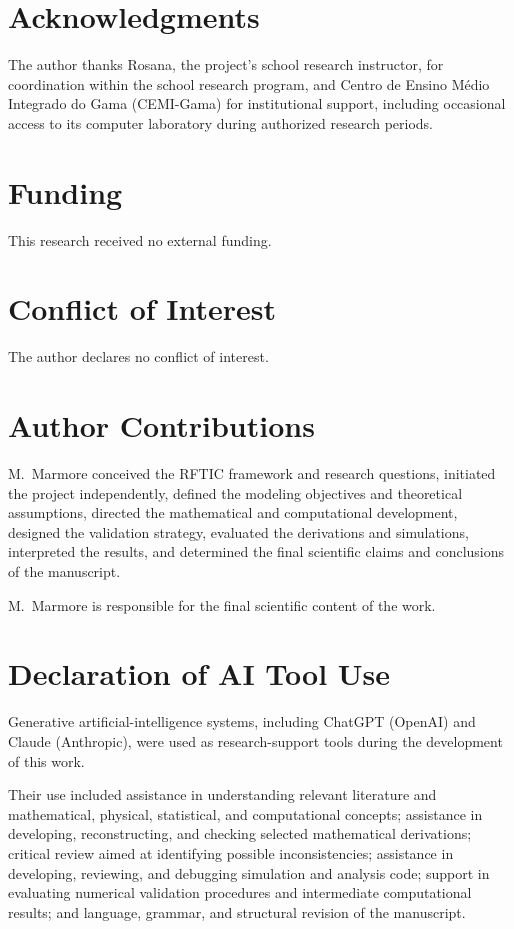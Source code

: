 \section*{Acknowledgments}
The author thanks Rosana, the project's school research instructor, for
coordination within the school research program, and Centro de Ensino Médio
Integrado do Gama (CEMI-Gama) for institutional support, including occasional
access to its computer laboratory during authorized research periods.

\section*{Funding}
This research received no external funding.

\section*{Conflict of Interest}
The author declares no conflict of interest.

\section*{Author Contributions}
M.~Marmore conceived the RFTIC framework and research questions, initiated the
project independently, defined the modeling objectives and theoretical
assumptions, directed the mathematical and computational development, designed
the validation strategy, evaluated the derivations and simulations, interpreted
the results, and determined the final scientific claims and conclusions of the
manuscript.

M.~Marmore is responsible for the final scientific content of the work.

\section*{Declaration of AI Tool Use}
Generative artificial-intelligence systems, including ChatGPT (OpenAI) and
Claude (Anthropic), were used as research-support tools during the development
of this work.

Their use included assistance in understanding relevant literature and
mathematical, physical, statistical, and computational concepts; assistance in
developing, reconstructing, and checking selected mathematical derivations;
critical review aimed at identifying possible inconsistencies; assistance in
developing, reviewing, and debugging simulation and analysis code; support in
evaluating numerical validation procedures and intermediate computational
results; and language, grammar, and structural revision of the manuscript.

